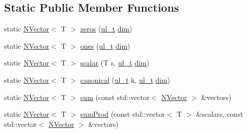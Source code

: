 \subsection*{Static Public Member Functions}
\begin{DoxyCompactItemize}
\item 
static \mbox{\hyperlink{class_n_vector}{N\+Vector}}$<$ T $>$ \mbox{\hyperlink{class_n_vector_a6253cef3c39dd9d388bbf7d17069bc51}{zeros}} (\mbox{\hyperlink{typedef_8h_a1b140a2034db3f5dfe18a987745df43a}{ul\+\_\+t}} \mbox{\hyperlink{class_n_vector_a7589027db20509ac4d93490bb9a1979a}{dim}})
\item 
static \mbox{\hyperlink{class_n_vector}{N\+Vector}}$<$ T $>$ \mbox{\hyperlink{class_n_vector_afb6358454a8dfaac4963352843b17bbc}{ones}} (\mbox{\hyperlink{typedef_8h_a1b140a2034db3f5dfe18a987745df43a}{ul\+\_\+t}} \mbox{\hyperlink{class_n_vector_a7589027db20509ac4d93490bb9a1979a}{dim}})
\item 
static \mbox{\hyperlink{class_n_vector}{N\+Vector}}$<$ T $>$ \mbox{\hyperlink{class_n_vector_add6abbdea5f58e6887367860aa0f619d}{scalar}} (T s, \mbox{\hyperlink{typedef_8h_a1b140a2034db3f5dfe18a987745df43a}{ul\+\_\+t}} \mbox{\hyperlink{class_n_vector_a7589027db20509ac4d93490bb9a1979a}{dim}})
\item 
static \mbox{\hyperlink{class_n_vector}{N\+Vector}}$<$ T $>$ \mbox{\hyperlink{class_n_vector_a37b19eb888023546363e952cd39ea3a1}{canonical}} (\mbox{\hyperlink{typedef_8h_a1b140a2034db3f5dfe18a987745df43a}{ul\+\_\+t}} k, \mbox{\hyperlink{typedef_8h_a1b140a2034db3f5dfe18a987745df43a}{ul\+\_\+t}} \mbox{\hyperlink{class_n_vector_a7589027db20509ac4d93490bb9a1979a}{dim}})
\item 
static \mbox{\hyperlink{class_n_vector}{N\+Vector}}$<$ T $>$ \mbox{\hyperlink{class_n_vector_af0f5749405554fc23a0af67ad4f9e9e5}{sum}} (const std\+::vector$<$ \mbox{\hyperlink{class_n_vector}{N\+Vector}} $>$ \&vectors)
\item 
static \mbox{\hyperlink{class_n_vector}{N\+Vector}}$<$ T $>$ \mbox{\hyperlink{class_n_vector_a89ea4dcaa84313e6446e0be35ec7bbe1}{sum\+Prod}} (const std\+::vector$<$ T $>$ \&scalars, const std\+::vector$<$ \mbox{\hyperlink{class_n_vector}{N\+Vector}} $>$ \&vectors)
\end{DoxyCompactItemize}
